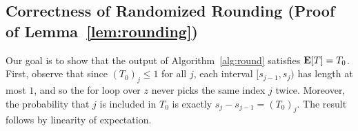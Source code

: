 \subsection{Correctness of Randomized Rounding (Proof of Lemma~\ref{lem:rounding})}
\label{sec:rounding-proof}

Our goal is to show that the output of 
Algorithm~\ref{alg:round} satisfies $\mathbf{E}[T] = T_0$. First, observe that 
since $(T_0)_j \leq 1$ for all $j$, each interval $[s_{j-1},s_j)$ has length 
at most $1$, and so the for loop over $z$ never picks the same index $j$ 
twice. Moreover, the probability that $j$ is included in $T_0$ is exactly 
$s_j - s_{j-1} = (T_0)_j$. The result follows by linearity of expectation.
